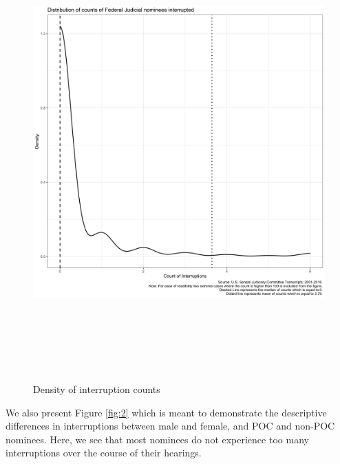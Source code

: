\documentclass [12pt]{article}
\begin{document}
	\begin{figure}[H]
	    \centering
	    \includegraphics[height = 175mm, width = 175mm]{../tables_figures/interruptions_distribution.png}
	    \caption{Density of interruption counts}
	    \label{fig:1}
	\end{figure}
    
    We also present Figure \ref{fig:2} which is meant to demonstrate the descriptive differences in interruptions between male and female, and POC and non-POC nominees. Here, we see that most nominees do not experience too many interruptions over the course of their hearings.
    
\end{document}
